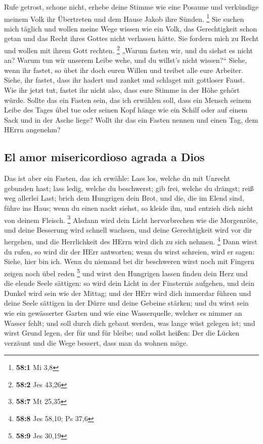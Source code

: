  Rufe getrost, schone nicht, erhebe deine Stimme wie eine
Posaune und verkündige meinem Volk ihr Übertreten und dem Hause Jakob
ihre Sünden. \footnote{\textbf{58:1} Mi 3,8}  Sie suchen
mich täglich und wollen meine Wege wissen wie ein Volk, das
Gerechtigkeit schon getan und das Recht ihres Gottes nicht verlassen
hätte. Sie fordern mich zu Recht und wollen mit ihrem Gott rechten.
\footnote{\textbf{58:2} Jes 43,26}  „Warum fasten wir, und
du siehst es nicht an? Warum tun wir unserem Leibe wehe, und du willst's
nicht wissen?{}`` Siehe, wenn ihr fastet, so übet ihr doch euren Willen
und treibet alle eure Arbeiter.  Siehe, ihr fastet, dass
ihr hadert und zanket und schlaget mit gottloser Faust. Wie ihr jetzt
tut, fastet ihr nicht also, dass eure Stimme in der Höhe gehört würde.
 Sollte das ein Fasten sein, das ich erwählen soll, dass
ein Mensch seinem Leibe des Tages übel tue oder seinen Kopf hänge wie
ein Schilf oder auf einem Sack und in der Asche liege? Wollt ihr das ein
Fasten nennen und einen Tag, dem HErrn angenehm?

\hypertarget{el-amor-misericordioso-agrada-a-dios}{%
\subsection{El amor misericordioso agrada a
Dios}\label{el-amor-misericordioso-agrada-a-dios}}

 Das ist aber ein Fasten, das ich erwähle: Lass los,
welche du mit Unrecht gebunden hast; lass ledig, welche du beschwerst;
gib frei, welche du drängst; reiß weg allerlei Last; 
brich dem Hungrigen dein Brot, und die, die im Elend sind, führe ins
Haus; wenn du einen nackt siehst, so kleide ihn, und entzieh dich nicht
von deinem Fleisch. \footnote{\textbf{58:7} Mt 25,35} 
Alsdann wird dein Licht hervorbrechen wie die Morgenröte, und deine
Besserung wird schnell wachsen, und deine Gerechtigkeit wird vor dir
hergehen, und die Herrlichkeit des HErrn wird dich zu sich nehmen.
\footnote{\textbf{58:8} Jes 58,10; Ps 37,6}  Dann wirst du
rufen, so wird dir der HErr antworten; wenn du wirst schreien, wird er
sagen: Siehe, hier bin ich. Wenn du niemand bei dir beschweren wirst
noch mit Fingern zeigen noch übel reden \footnote{\textbf{58:9} Jes
  30,19}  und wirst den Hungrigen lassen finden dein Herz
und die elende Seele sättigen: so wird dein Licht in der Finsternis
aufgehen, und dein Dunkel wird sein wie der Mittag;  und
der HErr wird dich immerdar führen und deine Seele sättigen in der Dürre
und deine Gebeine stärken; und du wirst sein wie ein gewässerter Garten
und wie eine Wasserquelle, welcher es nimmer an Wasser fehlt;
 und soll durch dich gebaut werden, was lange wüst
gelegen ist; und wirst Grund legen, der für und für bleibe; und sollst
heißen: Der die Lücken verzäunt und die Wege bessert, dass man da wohnen
möge.


